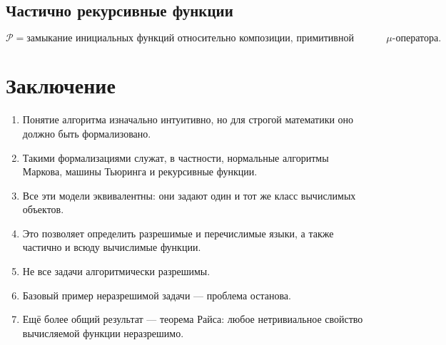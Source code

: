 \documentclass[12pt,a4paper]{article}
\begin{document}
\subsection*{Частично рекурсивные функции}
\[
\mathcal P = \text{замыкание инициальных функций относительно композиции, примитивной рекурсии и }\mu\text{-оператора}.
\]

\section{Заключение}
\begin{enumerate}
    \item Понятие алгоритма изначально интуитивно, но для строгой математики оно должно быть формализовано.
    \item Такими формализациями служат, в частности, нормальные алгоритмы Маркова, машины Тьюринга и рекурсивные функции.
    \item Все эти модели эквивалентны: они задают один и тот же класс вычислимых объектов.
    \item Это позволяет определить разрешимые и перечислимые языки, а также частично и всюду вычислимые функции.
    \item Не все задачи алгоритмически разрешимы.
    \item Базовый пример неразрешимой задачи --- проблема останова.
    \item Ещё более общий результат --- теорема Райса: любое нетривиальное свойство вычисляемой функции неразрешимо.
\end{enumerate}
\end{document}
